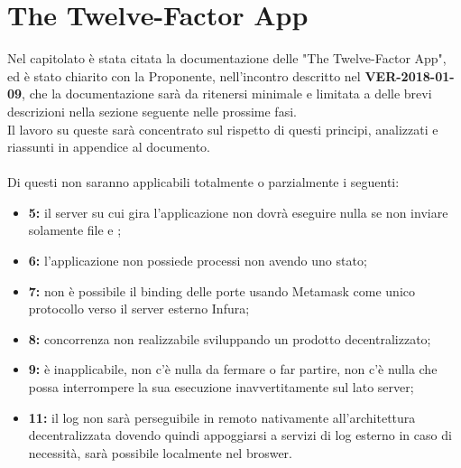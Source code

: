 \documentclass[PianoDiQualifica.tex]{subfiles}
\begin{document}
\section{The Twelve-Factor App}
Nel capitolato è stata citata la documentazione delle "The Twelve-Factor App", ed è stato chiarito con la Proponente, nell'incontro descritto nel \textbf{VER-2018-01-09}, che la documentazione sarà da ritenersi minimale e limitata a delle brevi descrizioni nella sezione seguente nelle prossime fasi.\\
Il lavoro su queste sarà concentrato sul rispetto di questi principi, analizzati e riassunti in appendice al documento.\\\\
Di questi non saranno applicabili totalmente o parzialmente i seguenti:
\begin{itemize}
	\item \textbf{5:} il server su cui gira l'applicazione non dovrà eseguire nulla se non inviare solamente file  e ;
	\item \textbf{6:} l'applicazione non possiede processi non avendo uno stato;
	\item \textbf{7:} non è possibile il binding delle porte usando Metamask come unico protocollo verso il server esterno Infura;
	\item \textbf{8:} concorrenza non realizzabile sviluppando un prodotto decentralizzato;
	\item \textbf{9:} è inapplicabile, non c'è nulla da fermare o far partire, non c'è nulla che possa interrompere la sua esecuzione inavvertitamente sul lato server;
	\item \textbf{11:} il log non sarà perseguibile in remoto nativamente all'architettura decentralizzata dovendo quindi appoggiarsi a servizi di log esterno in caso di necessità, sarà possibile localmente nel broswer.
\end{itemize}
\end{document}
